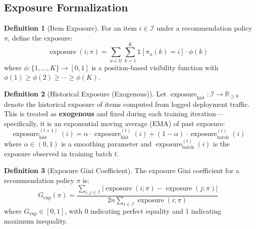 \documentclass[11pt,a4paper]{article}
\theoremstyle{definition}
\newtheorem{definition}{Definition}[section]
\theoremstyle{plain}
\theoremstyle{remark}
\newcommand{\R}{\mathbb{R}}
\DeclareMathOperator{\exposure}{exposure}
\begin{document}
\subsection{Exposure Formalization}
\label{subsec:exposure}

\begin{definition}[Item Exposure]
\label{def:exposure}
For an item $i \in \mathcal{I}$ under a recommendation policy $\pi$, define the exposure:
\begin{equation}
    \exposure(i; \pi) = \sum_{u \in \mathcal{U}} \sum_{k=1}^{K} \mathbb{1}[\pi_u(k) = i] \cdot \phi(k)
\end{equation}
where $\phi: \{1, \ldots, K\} \rightarrow [0, 1]$ is a position-based visibility function with $\phi(1) \geq \phi(2) \geq \cdots \geq \phi(K)$.
\end{definition}

\begin{definition}[Historical Exposure (Exogenous)]
\label{def:hist_exposure}
Let $\exposure_{\text{hist}}: \mathcal{I} \rightarrow \R_{\geq 0}$ denote the historical exposure of items computed from logged deployment traffic. This is treated as \textbf{exogenous} and fixed during each training iteration---specifically, it is an exponential moving average (EMA) of past exposure:
\begin{equation}
    \exposure_{\text{hist}}^{(t+1)}(i) = \alpha \cdot \exposure_{\text{hist}}^{(t)}(i) + (1 - \alpha) \cdot \exposure_{\text{batch}}^{(t)}(i)
\end{equation}
where $\alpha \in (0, 1)$ is a smoothing parameter and $\exposure_{\text{batch}}^{(t)}(i)$ is the exposure observed in training batch $t$.
\end{definition}

\begin{definition}[Exposure Gini Coefficient]
\label{def:exposure_gini}
The exposure Gini coefficient for a recommendation policy $\pi$ is:
\begin{equation}
    G_{\text{exp}}(\pi) = \frac{\sum_{i, j \in \mathcal{I}} |\exposure(i; \pi) - \exposure(j; \pi)|}{2n \sum_{i \in \mathcal{I}} \exposure(i; \pi)}
\end{equation}
where $G_{\text{exp}} \in [0, 1]$, with 0 indicating perfect equality and 1 indicating maximum inequality.
\end{definition}
\end{document}
